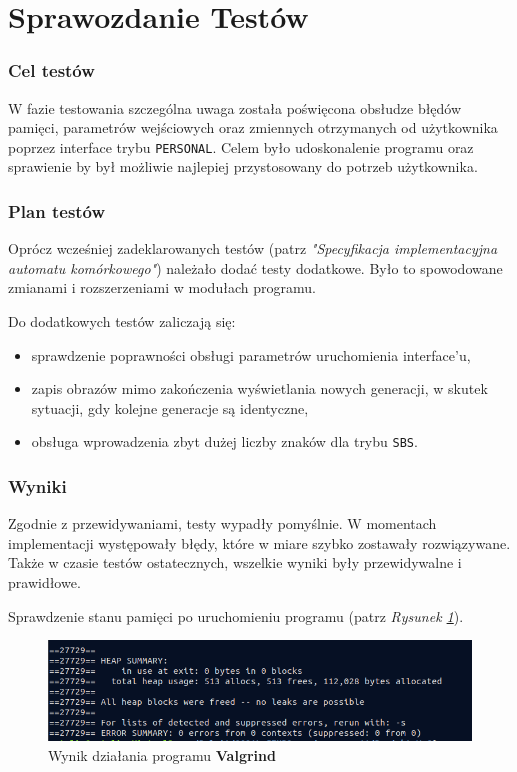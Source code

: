 \documentclass[a4paper]{article}
\begin{document}
\newpage

\part{Sprawozdanie Test\'ow}

\section{Cel test\'ow}

\quad W fazie testowania szczeg\'olna uwaga zosta\l{}a po\'swi\k{e}cona obs\l{}udze b\l{}\k{e}d\'ow pami\k{e}ci, parametr\'ow wej\'sciowych 
oraz zmiennych otrzymanych od u\.zytkownika poprzez interface trybu \texttt{PERSONAL}.
Celem by\l{}o udoskonalenie programu oraz sprawienie by by\l{} mo\.zliwie najlepiej przystosowany do potrzeb u\.zytkownika.

\section{Plan test\'ow}

\quad Opr\'ocz wcze\'sniej zadeklarowanych test\'ow (patrz \textit{"Specyfikacja implementacyjna automatu kom\'orkowego"}) nale\.za\l{}o doda\'c testy dodatkowe.
By\l{}o to spowodowane zmianami i rozszerzeniami w modu\l{}ach programu.


Do dodatkowych test\'ow zaliczaj\k{a} si\k{e}:
\begin{itemize}
	\item sprawdzenie poprawno\'sci obs\l{}ugi parametr\'ow uruchomienia interface'u,
	\item zapis obraz\'ow mimo zako\'nczenia wy\'swietlania nowych generacji, w skutek sytuacji, gdy kolejne generacje s\k{a} identyczne,
	\item obs\l{}uga wprowadzenia zbyt du\.zej liczby znak\'ow dla trybu \texttt{SBS}.
\end{itemize}

\section{Wyniki}

\quad Zgodnie z przewidywaniami, testy wypad\l{}y pomy\'slnie.
W momentach implementacji wyst\k{e}powa\l{}y  b\l{}\k{e}dy, kt\'ore w miare szybko zostawa\l{}y rozwi\k{a}zywane.
Tak\.ze w czasie test\'ow ostatecznych, wszelkie wyniki by\l{}y przewidywalne i prawid\l{}owe.

Sprawdzenie stanu pami\k{e}ci po uruchomieniu programu (patrz \textit{Rysunek \ref{fig:test}}).
\begin{figure}[h!]
        \centering
        \includegraphics[scale=0.41]{test}
	\caption{Wynik dzia\l{}ania programu \textbf{Valgrind}}
        \label{fig:test}
\end{figure}
\end{document}
